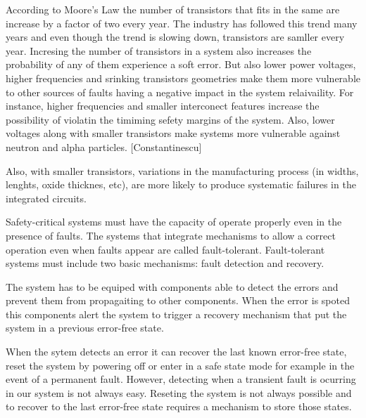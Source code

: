 According to Moore's Law the number of transistors that fits in the same are increase by a factor of two every year. The industry has followed this trend many years and even though the trend is slowing down, transistors are samller every year. Incresing the number of transistors in a system also increases the probability of any of them experience a soft error. But also lower power voltages, higher frequencies and srinking transistors geometries make them more vulnerable to other sources of faults having a negative impact in the system relaivaility. For instance, higher frequencies and smaller interconect features increase the possibility of violatin the timiming sefety margins of the system. Also, lower voltages along with smaller transistors make systems more vulnerable against neutron and alpha particles. [Constantinescu]

Also, with smaller transistors, variations in the manufacturing process (in widths, lenghts, oxide thicknes, etc), are more likely to produce systematic failures in the integrated circuits. 

Safety-critical systems must have the capacity of operate properly even in the presence of faults. The systems that integrate mechanisms to allow a correct operation even when faults appear are called fault-tolerant. Fault-tolerant systems must include two basic mechanisms: fault detection and recovery.

The system has to be equiped with components able to detect the errors and prevent them from propagaiting to other components. When the error is spoted this components alert the system to trigger a recovery mechanism that put the system in a previous error-free state.

When the sytem detects an error it can recover the last known error-free state, reset the system by powering off or enter in a safe state mode for example in the event of a permanent fault. However, detecting when a transient fault is ocurring in our system is not always easy. Reseting the system is not always possible and to recover to the last error-free state requires a mechanism to store those states. 


